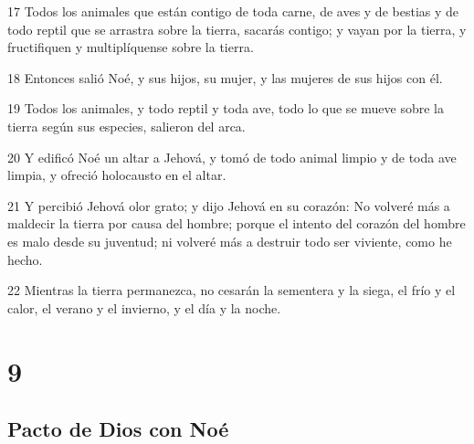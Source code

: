\par 17 Todos los animales que están contigo de toda carne, de aves y de bestias y de todo reptil que se arrastra sobre la tierra, sacarás contigo; y vayan por la tierra, y fructifiquen y multiplíquense sobre la tierra.
\par 18 Entonces salió Noé, y sus hijos, su mujer, y las mujeres de sus hijos con él.
\par 19 Todos los animales, y todo reptil y toda ave, todo lo que se mueve sobre la tierra según sus especies, salieron del arca.
\par 20 Y edificó Noé un altar a Jehová, y tomó de todo animal limpio y de toda ave limpia, y ofreció holocausto en el altar.
\par 21 Y percibió Jehová olor grato; y dijo Jehová en su corazón: No volveré más a maldecir la tierra por causa del hombre; porque el intento del corazón del hombre es malo desde su juventud; ni volveré más a destruir todo ser viviente, como he hecho.
\par 22 Mientras la tierra permanezca, no cesarán la sementera y la siega, el frío y el calor, el verano y el invierno, y el día y la noche.

\chapter{9}

\section*{Pacto de Dios con Noé}

